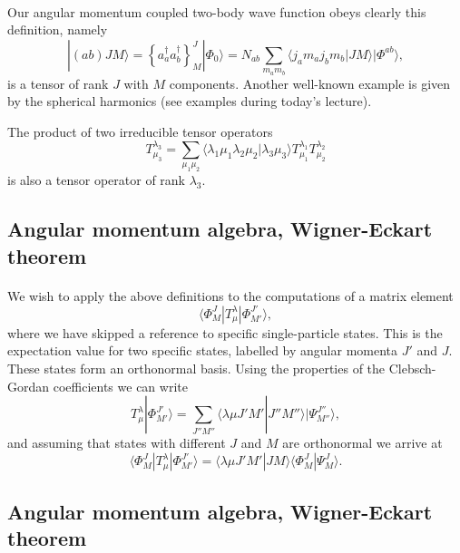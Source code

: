\documentclass[%
twoside,                 %
final,                   %
10pt]{article}
\begin{document}
\paragraph{}
Our angular momentum coupled two-body wave function obeys clearly this definition, namely
\[
|(ab)JM\rangle  = \left\{a^{\dagger}_aa^{\dagger}_b\right\}^J_M|\Phi_0\rangle=N_{ab}\sum_{m_am_b}\langle j_am_aj_bm_b|JM\rangle|\Phi^{ab}\rangle, 
\]
is a tensor of rank $J$ with $M$ components. Another well-known example is given by the spherical harmonics (see examples during today's lecture). 

The product of two irreducible tensor operators
\[
T^{\lambda_3}_{\mu_3}=\sum_{\mu_1\mu_2}\langle \lambda_1\mu_1\lambda_2\mu_2|\lambda_3\mu_3\rangle T^{\lambda_1}_{\mu_1}T^{\lambda_2}_{\mu_2}
\] 
is also a tensor operator of rank $\lambda_3$.




\subsection{Angular momentum algebra, Wigner-Eckart theorem}

\paragraph{}
We wish to apply the above definitions to the computations of a matrix element
\[
\langle \Phi^J_M|T^{\lambda}_{\mu}|\Phi^{J'}_{M'}\rangle,
\]
where we have skipped a reference to specific single-particle states. This is the expectation value for two specific states, labelled by angular momenta $J'$ and $J$. These states form an orthonormal basis.
Using the properties of the Clebsch-Gordan coefficients we can write 
\[
T^{\lambda}_{\mu}|\Phi^{J'}_{M'}\rangle=\sum_{J''M''}\langle \lambda \mu J'M'|J''M''\rangle|\Psi^{J''}_{M''}\rangle,
\]
and assuming that states with different $J$ and $M$ are orthonormal we arrive at
\[
\langle \Phi^J_M|T^{\lambda}_{\mu}|\Phi^{J'}_{M'}\rangle= \langle \lambda \mu J'M'|JM\rangle \langle \Phi^J_M|\Psi^{J}_{M}\rangle.
\]



\subsection{Angular momentum algebra, Wigner-Eckart theorem}
\end{document}
